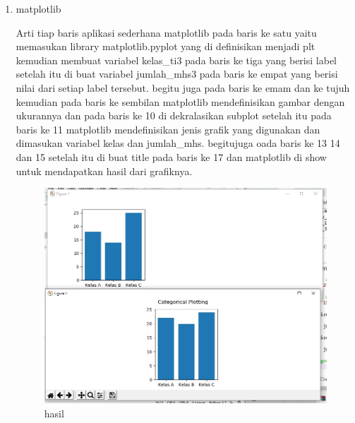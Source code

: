 \begin{enumerate}
\item matplotlib\par
Arti tiap baris aplikasi sederhana matplotlib pada baris ke satu yaitu memasukan library matplotlib.pyplot yang di definisikan menjadi plt kemudian membuat variabel kelas\_ti3 pada baris ke tiga yang berisi label setelah itu di buat variabel jumlah\_mhs3 pada baris ke empat yang berisi nilai dari setiap label tersebut. begitu juga pada baris ke emam dan ke tujuh kemudian pada baris ke sembilan matplotlib mendefinisikan gambar dengan ukurannya dan pada baris ke 10 di dekralasikan subplot setelah itu pada baris ke 11 matplotlib mendefinisikan jenis grafik yang digunakan dan dimasukan variabel kelas dan jumlah\_mhs. begitujuga oada baris ke 13 14 dan 15 setelah itu di buat title  pada baris ke 17 dan matplotlib di show untuk mendapatkan hasil dari grafiknya.

\begin{figure}[ht]
\centering
\includegraphics[scale=0.5]{figures/1174042/chapter3/2,3.JPG}
\caption{hasil}
\label{contoh}
\end{figure}


\end{enumerate}
